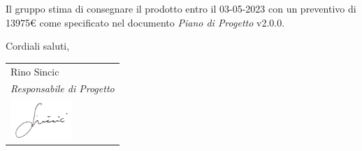 \documentclass[10pt]{article}
\begin{document}
Il gruppo stima di consegnare il prodotto entro il 03-05-2023 con un preventivo di 13975\euro{}  come
specificato nel documento \textit{Piano di Progetto} v2.0.0.


Cordiali saluti,

\vspace{15pt}

\hfill
\begin{tabular}{ l @{} }
Rino Sincic\\
\textit{Responsabile di Progetto}\\
\includegraphics[width=2.3cm]{images/Rino_Sincic_firma.png}
\end{tabular}
\end{document}
